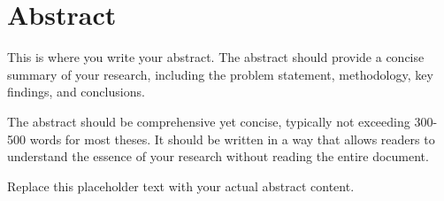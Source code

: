 
\chapter*{Abstract}
\thispagestyle{plain}

This is where you write your abstract. The abstract should provide a concise summary of your research, including the problem statement, methodology, key findings, and conclusions. 

The abstract should be comprehensive yet concise, typically not exceeding 300-500 words for most theses. It should be written in a way that allows readers to understand the essence of your research without reading the entire document.

Replace this placeholder text with your actual abstract content.

